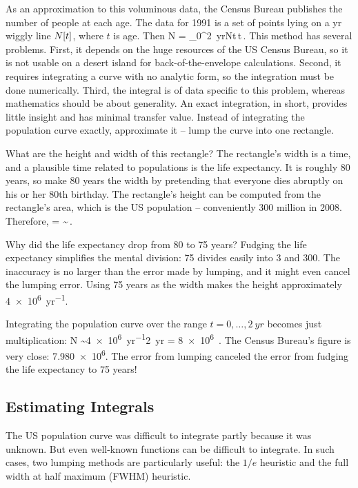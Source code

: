 As an approximation to this voluminous data, the Census Bureau publishes the number of people at each age. The data for 1991 is a set of points lying on a yr wiggly line $N\!\left[{t}\right]$, where $t$ is age. Then
\beq
N = \int_0^{\SI{2}{yr}}N\vat t\,\dx t\,.
\eeq
This method has several problems. First, it depends on the huge resources of the US Census Bureau, so it is not usable on a desert island for back-of-the-envelope calculations. Second, it requires integrating a curve with no analytic form, so the integration must be done numerically. Third, the integral is of data specific to this problem, whereas mathematics should be about generality. An exact integration, in short, provides little insight and has minimal transfer value. Instead of integrating the population curve exactly, approximate it -- lump the curve into one rectangle.

What are the height and width of this rectangle? The rectangle's width is a time, and a plausible time related to populations is the life expectancy. It is roughly 80 years, so make 80 years the width by pretending that everyone dies abruptly on his or her 80th birthday. The rectangle's height can be computed from the rectangle's area, which is the US population -- conveniently 300 million in 2008. Therefore,
\beq
{} =  \sim {}\,.
\eeq

Why did the life expectancy drop from 80 to 75 years? Fudging the life expectancy simplifies the mental division: 75 divides easily into 3 and 300. The inaccuracy is no larger than the error made by lumping, and it might even cancel the lumping error. Using 75 years as the width makes the height approximately \SI{4e6}{yr^{-1}}.

Integrating the population curve over the range $t=0,\dots,\SI{2}{yr}$ becomes just multiplication:
\beq
N \sim \SI{4e6}{yr^{-1}}\times \SI{2}{yr} = \num{8e6} \,.
\eeq
The Census Bureau’s figure is very close: \num{7.980e6}. The error from lumping canceled the error from fudging the life expectancy to 75 years!


\subsection{Estimating Integrals}
The US population curve was difficult to integrate partly because it was unknown. But even well-known functions can be difficult to integrate. In such cases, two lumping methods are particularly useful: the $1/e$ heuristic and the full width at half maximum (FWHM) heuristic.


